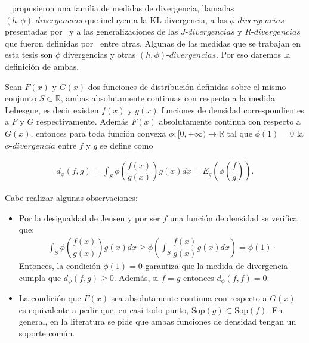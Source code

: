 ~\citet{Salicru1994} propusieron una familia de medidas de divergencia, llamadas $(h,\phi) \text{-} divergencias$ que incluyen a la KL divergencia, a las $\phi \text{-} divergencias$ presentadas por~\citet{Csiszar1967} y a las generalizaciones de las $J \text{-} divergencias$ y $R \text{-} divergencias$ que fueron definidas por~\citet{Taneja1989} entre otras. Algunas de las medidas que se trabajan en esta tesis son $\phi$ divergencias y otras  $(h,\phi) \text{-} divergencias$. Por eso daremos la definición de ambas.

\begin{definition}
	\label{fiDivergencia}
	Sean $F(x)$ y $G(x)$ dos funciones de distribución definidas sobre el mismo conjunto $S \subset \mathbb{R}$, ambas absolutamente continuas con respecto a la medida Lebesgue, es decir existen $f(x)$ y $g(x)$ funciones de densidad correspondientes a $F$ y $G$ respectivamente. Además $F(x)$ absolutamente continua con respecto a $G(x)$, entonces para toda función convexa $\phi:[0,+\infty)\longrightarrow \mathbb{R}$ tal que $\phi(1)=0$ la $\phi \text{-} divergencia$ entre $f$ y $g$ se define como
	
	\begin{align}
	d_{\phi}(f, g)=\int_{S}  \phi\left(\dfrac{f(x)}{g(x)}\right) g(x) dx=E_{g}\left(\phi\left(\dfrac{f}{g}\right)\right).
	\end{align}
\end{definition}

Cabe realizar algunas observaciones:

\begin{itemize}
	\item Por la desigualdad de Jensen y por ser $f$ una función de densidad se verifica que:
	\begin{align}
	\displaystyle \int_{S} \phi\left(\dfrac{f(x)}{g(x)}\right) g(x) dx \geq \phi\left(\int_{S} \dfrac{f(x)}{g(x)} g(x) dx\right)=\phi(1)\cdot
	\end{align}
	Entonces, la condición $\phi(1)=0$ garantiza que la medida de divergencia cumpla que $d_{\phi}(f, g) \geq 0.$ Además, si $f=g$ entonces $d_{\phi}(f, f)= 0.$ 
	\item La condición que $F(x)$ sea absolutamente continua con respecto a $G(x)$ es equivalente a pedir que, en casi todo punto, $\mathrm{Sop}(g) \subset \mathrm{Sop}(f).$ En general, en la literatura se pide que ambas funciones de densidad tengan un soporte común.
\end{itemize}

